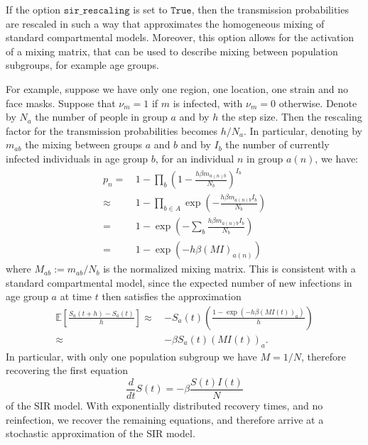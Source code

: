 \documentclass[10pt,letterpaper]{article}
\begin{document}
If the option $\texttt{sir{\_}rescaling}$ is set to $\texttt{True}$, then the transmission probabilities are rescaled in such a way that approximates the homogeneous mixing of standard compartmental models. Moreover, this option allows for the activation of a mixing matrix, that can be used to describe mixing between population subgroups, for example age groups.

For example, suppose we have only one region, one location, one strain and no face masks. Suppose that $\nu_m = 1$ if $m$ is infected, with $\nu_m = 0$ otherwise. Denote by $N_{a}$ the number of people in group $a$ and by $h$ the step size. Then the rescaling factor for the transmission probabilities becomes $h / N_a$. In particular, denoting by $m_{ab}$ the mixing between groups $a$ and $b$ and by $I_b$ the number of currently infected individuals in age group $b$, for an individual $n$ in group $a(n)$, we have:
\begin{align} \nonumber
p_n =\, & 1 - \prod_{b} \left(1 - \frac{h \beta m_{a(n) b}}{N_b}\right)^{I_b} \\ \nonumber
\approx\, & 1 - \prod_{b \in A} \exp \left(-\frac{h\beta m_{a(n)b} I_b}{N_b}\right)\\ \nonumber
 = \, & 1 - \exp \left(- \sum_{b} \frac{h\beta m_{a(n)b} I_b}{N_b}\right)\\[2mm] \nonumber
 = \, & 1 - \exp \left(- h\beta (MI)_{a(n)}\right) \nonumber
\end{align}
where $M_{ab} := m_{ab} / N_b$ is the normalized mixing matrix. This is consistent with a standard compartmental model, since the expected number of new infections in age group $a$ at time $t$ then satisfies the approximation
\begin{align} \nonumber
\mathbb{E}\left[\frac{S_a(t+h) - S_a(t)}{h}\right] \approx\, & -S_a(t)\left(\frac{1 - \exp \left(- h\beta (MI(t))_{a}\right)}{h}\right)\\[2mm] \nonumber
\approx\, & -\beta S_a(t) (MI(t))_a. \nonumber
\end{align}
In particular, with only one population subgroup we have $M = 1 / N$, therefore recovering the first equation
\begin{equation*}
\frac{d}{dt} S(t) = - \beta \frac{S(t)I(t)}{N}
\end{equation*}
of the SIR model. With exponentially distributed recovery times, and no reinfection, we recover the remaining equations, and therefore arrive at a stochastic approximation of the SIR model.
\end{document}

